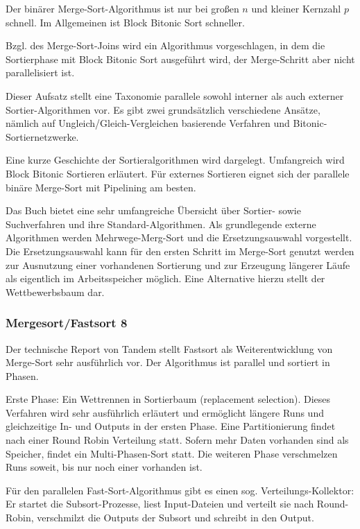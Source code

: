 \documentclass[a4paper,12pt,twoside]{article}
\begin{document}
Der binärer Merge-Sort-Algorithmus ist nur bei großen $n$ und kleiner Kernzahl $p$ schnell. Im Allgemeinen ist Block Bitonic Sort schneller.

Bzgl. des Merge-Sort-Joins wird ein Algorithmus vorgeschlagen, in dem die Sortierphase mit Block Bitonic Sort ausgeführt wird, der Merge-Schritt aber nicht parallelisiert ist. 

\textbf{}

Dieser Aufsatz stellt eine Taxonomie parallele sowohl interner als auch externer Sortier-Algorithmen vor. Es gibt zwei grundsätzlich verschiedene Ansätze, nämlich auf Ungleich/Gleich-Vergleichen basierende Verfahren und Bitonic-Sortiernetzwerke.

Eine kurze Geschichte der Sortieralgorithmen wird dargelegt. Umfangreich wird Block Bitonic Sortieren erläutert. Für externes Sortieren eignet sich der parallele binäre Merge-Sort mit Pipelining am besten. 

\textbf{}

Das Buch bietet eine sehr umfangreiche Übersicht über Sortier- sowie Suchverfahren und ihre Standard-Algorithmen. Als grundlegende externe Algorithmen werden Mehrwege-Merg-Sort und die Ersetzungsauswahl vorgestellt. Die Ersetzungsauswahl kann für den ersten Schritt im Merge-Sort genutzt werden zur Ausnutzung einer vorhandenen Sortierung und zur Erzeugung längerer Läufe als eigentlich im Arbeitsspeicher möglich. Eine Alternative hierzu stellt der Wettbewerbsbaum dar. 

\subsubsection{Mergesort/Fastsort 8}

\textbf{}

Der technische Report von Tandem stellt Fastsort als Weiterentwicklung von Merge-Sort sehr ausführlich vor. Der Algorithmus ist parallel und sortiert in Phasen.

Erste Phase: Ein Wettrennen in Sortierbaum (replacement selection). Dieses Verfahren wird sehr ausführlich erläutert und ermöglicht längere Runs und gleichzeitige In- und Outputs in der ersten Phase. Eine Partitionierung findet nach einer Round Robin Verteilung statt.
Sofern mehr Daten vorhanden sind als Speicher, findet ein Multi-Phasen-Sort statt. Die weiteren Phase verschmelzen Runs soweit, bis nur noch einer vorhanden ist.

Für den parallelen Fast-Sort-Algorithmus gibt es einen sog. Verteilungs-Kollektor: Er startet die Subsort-Prozesse, liest Input-Dateien und verteilt sie nach Round-Robin, verschmilzt die Outputs der Subsort und schreibt in den Output.
\end{document}

